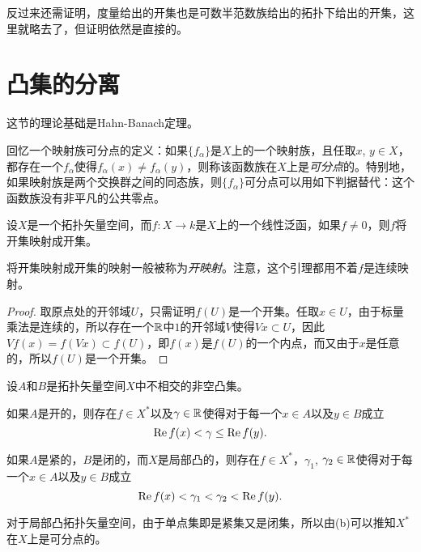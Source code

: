 反过来还需证明，度量给出的开集也是可数半范数族给出的拓扑下给出的开集，这里就略去了，但证明依然是直接的。
\section{凸集的分离}

这节的理论基础是Hahn-Banach定理。

回忆一个映射族可分点的定义：如果$\{f_\alpha\}$是$X$上的一个映射族，且任取$x$, $y\in X$，都存在一个$f_\alpha$使得$f_\alpha(x)\neq f_\alpha(y)$，则称该函数族在$X$上是\textit{可分点}的。特别地，如果映射族是两个交换群之间的同态族，则$\{f_\alpha\}$可分点可以用如下判据替代：这个函数族没有非平凡的公共零点。

\begin{lem}
	设$X$是一个拓扑矢量空间，而$f:X \to k$是$X$上的一个线性泛函，如果$f\neq 0$，则$f$将开集映射成开集。
\end{lem}

将开集映射成开集的映射一般被称为\textit{开映射}。注意，这个引理都用不着$f$是连续映射。

\begin{proof}
	取原点处的开邻域$U$，只需证明$f(U)$是一个开集。任取$x\in U$，由于标量乘法是连续的，所以存在一个$\mathbb{R}$中$1$的开邻域$V$使得$Vx\subset U$，因此$V f(x)=f(Vx)\subset f(U)$，即$f(x)$是$f(U)$的一个内点，而又由于$x$是任意的，所以$f(U)$是一个开集。
\end{proof}

\begin{thm}
	设$A$和$B$是拓扑矢量空间$X$中不相交的非空凸集。
	\begin{compactenum}[(a)]
	\item 如果$A$是开的，则存在$f\in X^*$以及$\gamma\in \mathbb{R}$使得对于每一个$x\in A$以及$y\in B$成立
	\[
		\operatorname{Re} f(x)<\gamma \leq \operatorname{Re} f(y).
	\]
	\item 如果$A$是紧的，$B$是闭的，而$X$是局部凸的，则存在$f\in X^*$，$\gamma_1$, $\gamma_2\in\mathbb{R}$使得对于每一个$x\in A$以及$y\in B$成立
	\[
		\operatorname{Re} f(x)<\gamma_1<\gamma_2<\operatorname{Re} f(y).
	\]
	\end{compactenum}
\end{thm}

对于局部凸拓扑矢量空间，由于单点集即是紧集又是闭集，所以由(b)可以推知$X^*$在$X$上是可分点的。

